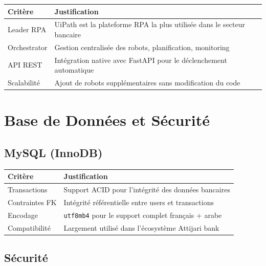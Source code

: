 \documentclass[12pt,a4paper]{report}
\begin{document}
\begin{table}[H]
\centering
\begin{tabularx}{\textwidth}{|l|X|}
\hline
\textbf{Critère} & \textbf{Justification} \\
\hline
Leader RPA & UiPath est la plateforme RPA la plus utilisée dans le secteur bancaire \\
\hline
Orchestrator & Gestion centralisée des robots, planification, monitoring \\
\hline
API REST & Intégration native avec FastAPI pour le déclenchement automatique \\
\hline
Scalabilité & Ajout de robots supplémentaires sans modification du code \\
\hline
\end{tabularx}
\end{table}

\section{Base de Données et Sécurité}

\subsection{MySQL (InnoDB)}

\begin{table}[H]
\centering
\begin{tabularx}{\textwidth}{|l|X|}
\hline
\textbf{Critère} & \textbf{Justification} \\
\hline
Transactions & Support ACID pour l'intégrité des données bancaires \\
\hline
Contraintes FK & Intégrité référentielle entre users et transactions \\
\hline
Encodage & \texttt{utf8mb4} pour le support complet français + arabe \\
\hline
Compatibilité & Largement utilisé dans l'écosystème Attijari bank \\
\hline
\end{tabularx}
\end{table}

\subsection{Sécurité}
\end{document}
